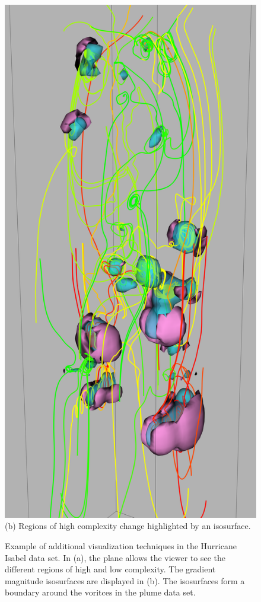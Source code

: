 \documentclass{egpubl}
\begin{document}
\begin{figure}[h]
\begin{minipage}{0.47\linewidth}
                \end{minipage}
                \begin{minipage}{0.47\linewidth}
                        \includegraphics[height = 2\linewidth]{Images/plume_grad_crop.png}\\(b) Regions of high complexity change highlighted by an isosurface. \vspace{0.2em}
                \end{minipage}
        \caption{Example of additional visualization techniques in the Hurricane Isabel data set. In (a), the plane allows the viewer to see the different regions of high and low complexity. The gradient magnitude isosurfaces are displayed in (b). The isosurfaces form a boundary around the voritces in the plume data set.}
        \label{fig:plume_additional}
\end{figure}
\end{document}
